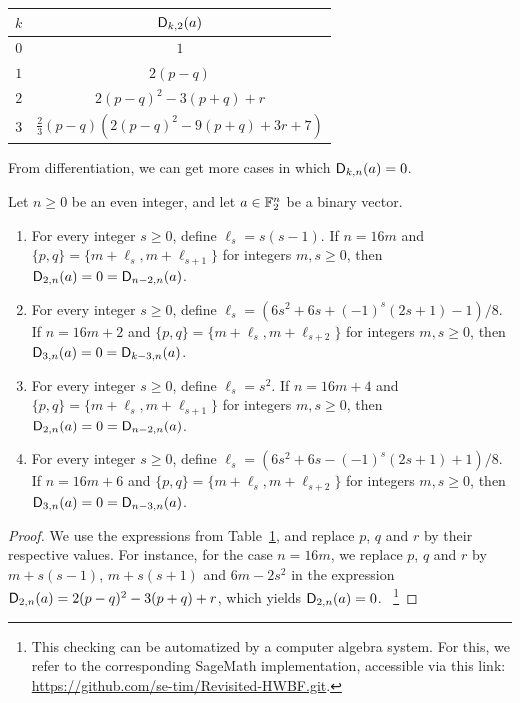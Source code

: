 \documentclass[11pt]{llncs}
\begin{document}
\begin{table}[ht]
	\small
	\centering
	\begin{tabular}{|c|c|}
		\hline
		$k$ & $\Dnka 2ka$\\ \hline
		$0$&$1$\\
		$1$&$2(p-q)$\\ 
		$2$&$2(p-q)^2-3(p+q)+r$\\
		$3$&$\frac 23(p-q)\left(2(p-q)^2-9(p+q)+3r+7\right)$\\ \hline
	\end{tabular}
	\label{tab:Dnka_small_k}
\end{table}

From differentiation, we can get more cases in which $\Dnka nka=0$.

\begin{proposition}
    Let $n\geq 0$ be an even integer, and let $a\in\F_2^n$ be a binary vector.
    \begin{enumerate}
        \item For every integer $s\geq0$, define $\ell_s=s(s-1)$. If $n=16m$ and $\{p,q\}=\{m+\ell_s,m+\ell_{s+1}\}$ for integers $m,s\geq 0$, then $\Dnka n2a=0=\Dnka n{n-2}a$.
        \item For every integer $s\geq 0$, define $\ell_s=\left(6s^2+6s+(-1)^s(2s+1)-1\right)/8$. If $n=16m+2$ and $\{p,q\}=\{m+\ell_s,m+\ell_{s+2}\}$ for integers $m,s\geq 0$, then $\Dnka n3a=0=\Dnka n{k-3}a$.
        \item For every integer $s\geq 0$, define $\ell_s=s^2$. If $n=16m+4$ and $\{p,q\}=\{m+\ell_s,m+\ell_{s+1}\}$ for integers $m,s\geq 0$, then $\Dnka n2a=0=\Dnka n{n-2}a$.
        \item For every integer $s\geq 0$, define $\ell_s=\left(6s^2+6s-(-1)^s(2s+1)+1\right)/8$. If $n=16m+6$ and $\{p,q\}=\{m+\ell_s,m+\ell_{s+2}\}$ for integers $m,s\geq 0$, then $\Dnka n3a=0=\Dnka n{n-3}a$.
    \end{enumerate}
\end{proposition}

\begin{proof}
 We use the expressions from Table~\ref{tab:Dnka_small_k}, and replace $p$, $q$ and $r$ by their respective values. 
 For instance, for the case $n=16m$, we replace $p$, $q$ and $r$ by $m+s(s-1)$, $m+s(s+1)$ and $6m-2s^2$ in the expression $\Dnka n2a=2(p-q)^2-3(p+q)+r$, which yields $\Dnka n2a=0$. ~\footnote{This checking can be automatized by a computer algebra system.
	\ifnum{}
		For this, we refer to the corresponding \textsf{SageMath} implementation, accessible via this link: \url{https://github.com/se-tim/Revisited-HWBF.git}.
	\fi
}
\end{proof}
\end{document}
